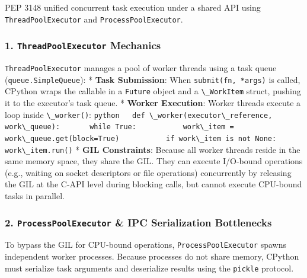 PEP 3148 unified concurrent task execution under a shared API using
\passthrough{\lstinline!ThreadPoolExecutor!} and
\passthrough{\lstinline!ProcessPoolExecutor!}.

\hypertarget{threadpoolexecutor-mechanics}{%
\subsubsection{\texorpdfstring{1. \texttt{ThreadPoolExecutor}
Mechanics}{1. ThreadPoolExecutor Mechanics}}\label{threadpoolexecutor-mechanics}}

\passthrough{\lstinline!ThreadPoolExecutor!} manages a pool of worker
threads using a task queue
(\passthrough{\lstinline!queue.SimpleQueue!}): * \textbf{Task
Submission}: When \passthrough{\lstinline!submit(fn, *args)!} is called,
CPython wraps the callable in a \passthrough{\lstinline!Future!} object
and a \passthrough{\lstinline!\_WorkItem!} struct, pushing it to the
executor's task queue. * \textbf{Worker Execution}: Worker threads
execute a loop inside \passthrough{\lstinline!\_worker()!}:
\passthrough{\lstinline!python   def \_worker(executor\_reference, work\_queue):       while True:           work\_item = work\_queue.get(block=True)           if work\_item is not None:               work\_item.run()!}
* \textbf{GIL Constraints}: Because all worker threads reside in the
same memory space, they share the GIL. They can execute I/O-bound
operations (e.g., waiting on socket descriptors or file operations)
concurrently by releasing the GIL at the C-API level during blocking
calls, but cannot execute CPU-bound tasks in parallel.

\hypertarget{processpoolexecutor-ipc-serialization-bottlenecks}{%
\subsubsection{\texorpdfstring{2. \texttt{ProcessPoolExecutor} \& IPC
Serialization
Bottlenecks}{2. ProcessPoolExecutor \& IPC Serialization Bottlenecks}}\label{processpoolexecutor-ipc-serialization-bottlenecks}}

To bypass the GIL for CPU-bound operations,
\passthrough{\lstinline!ProcessPoolExecutor!} spawns independent worker
processes. Because processes do not share memory, CPython must serialize
task arguments and deserialize results using the
\passthrough{\lstinline!pickle!} protocol.


